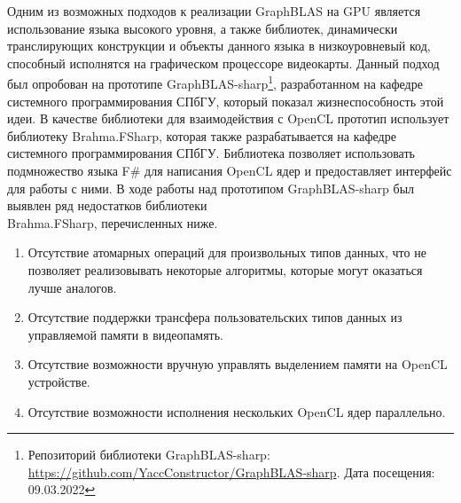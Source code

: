 Одним из возможных подходов к реализации GraphBLAS на GPU является использование языка высокого уровня, а также библиотек, динамически транслирующих конструкции и объекты данного языка в низкоуровневый код, способный исполнятся на графическом процессоре видеокарты. Данный подход был опробован на прототипе GraphBLAS-sharp\footnote{Репозиторий библиотеки GraphBLAS-sharp: \url{https://github.com/YaccConstructor/GraphBLAS-sharp}. Дата посещения: 09.03.2022}, разработанном на кафедре системного программирования СПбГУ, который показал  жизнеспособность этой идеи. В качестве библиотеки для взаимодействия с OpenCL прототип использует библиотеку Brahma.FSharp, которая также разрабатывается на кафедре системного программирования СПбГУ. Библиотека позволяет использовать подмножество языка F\# для написания OpenCL ядер и предоставляет интерфейс для работы с ними. В ходе работы над прототипом GraphBLAS-sharp был выявлен ряд недостатков библиотеки \\ Brahma.FSharp, перечисленных ниже.
 
\begin{enumerate}
\item Отсутствие атомарных операций для произвольных типов данных, что не позволяет реализовывать некоторые алгоритмы, которые могут оказаться лучше аналогов.
\item Отсутствие поддержки трансфера пользовательских типов данных
из управляемой памяти в видеопамять.
\item Отсутствие возможности вручную управлять выделением памяти на OpenCL устройстве.
\item Отсутствие возможности исполнения нескольких OpenCL ядер параллельно.
\end{enumerate}

